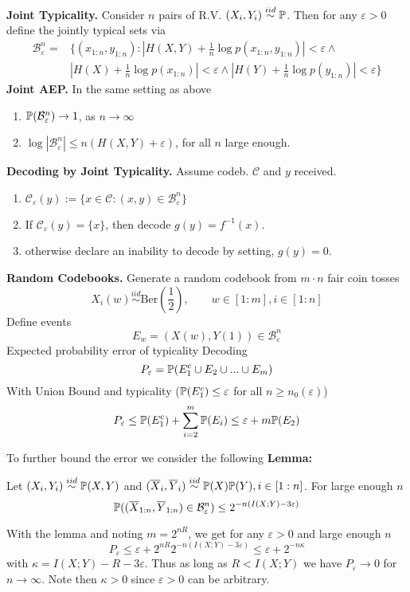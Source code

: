 \textbf{Joint Typicality.} Consider \(n\) pairs of R.V. \((X_i, Y_i) \overset{iid}{\sim} \P\). 
Then for any \(\varepsilon > 0\) define the jointly typical sets via 
\begin{align*}
    \mathcal{B}_{\varepsilon}^n = &\{(x_{1:n}, y_{1:n}): |H(X,Y) + \frac{1}{n}\log p(x_{1:n}, y_{1:n})| < \varepsilon \land \\ 
    &|H(X) + \frac{1}{n}\log p(x_{1:n})| < \varepsilon \land |H(Y) + \frac{1}{n}\log p(y_{1:n})| < \varepsilon \}
\end{align*}
\textbf{Joint AEP.} In the same setting as above
\begin{enumerate}[label=(\roman*)]
    \item \(\P(\mathcal{B}_\varepsilon^n) \to 1\), as \(n \to \infty\)
    \item \(\log |\mathcal{B}_\varepsilon^n| \leq n (H(X, Y)+\varepsilon)\), for all \(n\) large enough.
\end{enumerate}
\textbf{Decoding by Joint Typicality.}
Assume codeb. \(\mathcal{C}\) and \(y\) received.
\begin{enumerate}
    \item \(\mathcal{C}_\varepsilon(y) := \{x \in \mathcal{C}: (x, y) \in \mathcal{B}_\varepsilon^n\}\)
    \item If \(\mathcal{C}_\varepsilon(y) = \{x\}\), then decode \(g(y) = f^{-1}(x)\).
    \item otherwise declare an inability to decode by setting, \(g(y) = 0\).
\end{enumerate}
\textbf{Random Codebooks.}
Generate a random codebook from \(m \cdot n\) fair coin tosses
\[X_i(w) \overset{iid}{\sim} \text{Ber}\left(\frac{1}{2}\right), \qquad w \in [1:m], i \in [1:n]\]
Define events
\[E_w = (X(w), Y(1)) \in \mathcal{B}_\varepsilon^n\]
Expected probability error of typicality Decoding
\[P_\varepsilon = \P(E_1^c \cup E_2 \cup ... \cup E_m)\]
With Union Bound and typicality (\(\P(E_1^c) \leq \varepsilon\) for all \(n \geq n_0(\varepsilon)\))
\[P_\varepsilon \leq \P(E_1^c) + \sum_{i = 2}^m \P(E_i) \leq \varepsilon + m \P(E_2)\]

To further bound the error we consider the following \textbf{Lemma:}

Let \((X_i, Y_i) \overset{iid}{\sim} \P(X, Y)\) and 
\((\overline{X}_i, \overline{Y}_i) \overset{iid}{\sim} \P(X)\P(Y), i \in [1:n]\).
For large enough \(n\)
\[\P((\overline{X}_{1:n}, \overline{Y}_{1:n}) \in \mathcal{B}_\varepsilon^n) \leq 2^{-n(I(X;Y) - 3 \varepsilon)}\]

With the lemma and noting \(m = 2^{nR}\), we get for any \(\varepsilon > 0\) and large enough \(n\)
\[P_\varepsilon \leq \varepsilon + 2^{nR} 2^{-n(I(X;Y) - 3 \varepsilon)} \leq \varepsilon + 2^{-n\kappa}\]
 with \(\kappa = I(X;Y) - R - 3 \varepsilon\). Thus as long as \(R < I(X;Y)\) we have \(P_\varepsilon \to 0\) 
 for \(n \to \infty\). Note then \(\kappa > 0\) since \(\varepsilon > 0\) can be arbitrary.


